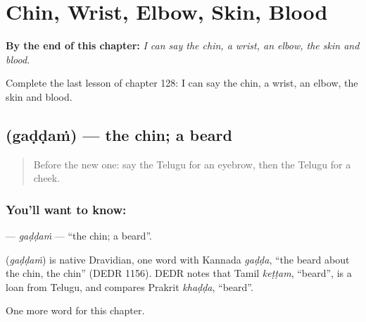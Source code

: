 
\chapter{Chin, Wrist, Elbow, Skin, Blood}
\label{ch:te-chin-wrist-elbow-skin-blood}

\begin{chapteropening}
\textbf{By the end of this chapter:} \emph{I can say the chin, a wrist, an elbow, the skin and blood.}

Complete the last lesson of chapter 128: I can say the chin, a wrist, an elbow, the skin and blood.
\end{chapteropening}

\section[\texorpdfstring{\te{గడ్డం} (gaḍḍaṁ)}{గడ్డం (gaḍḍaṁ)}]{ (gaḍḍaṁ) — the chin; a beard}

\label{lesson:TE-C128-gaddam}



\begin{quote}
Before the new one: say the Telugu for an eyebrow, then the Telugu for a cheek.
\end{quote}

\subsection*{You'll want to know: }
\textbf{} — \emph{gaḍḍaṁ} — \textquotedblleft{}the chin; a beard\textquotedblright{}.

\begin{cousinweb}
\textbf{} (\emph{gaḍḍaṁ}) is native Dravidian, one word with Kannada \emph{gaḍḍa}, \textquotedblleft{}the beard about the chin, the chin\textquotedblright{} (DEDR 1156). DEDR notes that Tamil \emph{keṭṭam}, \textquotedblleft{}beard\textquotedblright{}, is a loan from Telugu, and compares Prakrit \emph{khaḍḍa}, \textquotedblleft{}beard\textquotedblright{}.
\end{cousinweb}

\begin{grammarlens}[title={What you've built}]
One more word for this chapter.
\end{grammarlens}

